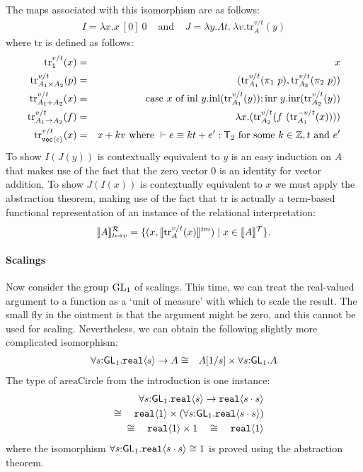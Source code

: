 The maps associated with this isomorphism are as follows:
\newcommand{\trans}[3]{\mathrm{tr}_{#1}^{{#2}/{#3}}}
\begin{eqnarray*}
I = \lambda x. x\ [0]\ 0 & \text{ and } &
J = \lambda y. \Lambda t.\ \lambda v. \trans A v t(y)
\end{eqnarray*}
where $\mathrm{tr}$ is defined as follows:
\begin{eqnarray*}
\trans{1} v t(x) & = & x\\
\trans{A_1\times A_2} v t(p) & = & (\trans{A_1} v t(\pi_1\ p),\trans{A_2} v t(\pi_2\ p))\\
\trans{A_1 + A_2} v t(x) & = & \textrm{case}\ x\ \textrm{of}\ \textrm{inl}\ y.\textrm{inl}(\trans{A_1} v t(y)); \textrm{inr}\ y.\textrm{inr}(\trans{A_2} v t(y))\\
\trans{A_1\to A_2} v t(f) & = & \lambda x. (\trans{A_2} v t(f\ (\trans{A_1}{-v} t(x))))\\
\trans{\tyPrim{vec}{e}} v t (x) & = & x + kv\text{ where }\vdash e \equiv k t + e' : \SynTransl{2}\text{ for some }k\in\setOfIntegers, t \text{ and }e'\\
\end{eqnarray*}
To show $I(J(y))$ is contextually equivalent to $y$ is an easy induction on $A$ that
makes use of the fact that the zero vector $0$ is an identity for vector addition. 
To show $J(I(x))$ is contextually equivalent to $x$ we must apply the abstraction theorem,
making use of the fact that $\mathrm{tr}$ is actually a term-based functional representation
of an instance of the relational interpretation:
\[
\rsem A {t \mapsto v} {} = \{ (x, \tmSem{\trans A v t (x)}) \mid x \in \tySem A\}.
\]

\paragraph{Scalings}
Now consider the group $\mathrm{GL}_1$ of scalings. This time, we can treat the real-valued
argument to a function as a `unit of measure' with which to scale the result. The small
fly in the ointment is that the argument might be zero, and this cannot be used for scaling.
Nevertheless, we can obtain the following slightly more complicated isomorphism:
\begin{eqnarray*}
\forall s\mathord:\mathsf{GL}_1.\textup{\texttt{real}}\langle s \rangle\to A
& \cong &
A[1/s]\times \forall s\mathord:\mathsf{GL}_1.A
\end{eqnarray*}
The type of $\mathrm{areaCircle}$ from the introduction is one instance:
\begin{eqnarray*}
\forall s\mathord:\mathsf{GL}_1.\textup{\texttt{real}}\langle s \rangle\to\textup{\texttt{real}}\langle s\cdot s \rangle\\
\quad\cong\quad \textup{\texttt{real}}\langle 1 \rangle\times(\forall s\mathord:\mathsf{GL}_1.\textup{\texttt{real}}\langle s\cdot s \rangle)\\
\quad\cong\quad \textup{\texttt{real}}\langle 1 \rangle\times 1\quad\cong\quad \textup{\texttt{real}}\langle 1 \rangle
\end{eqnarray*}
where the isomorphism $\forall s\mathord:\mathsf{GL}_1.\textup{\texttt{real}}\langle s\cdot s \rangle\cong 1$ is
proved using the abstraction theorem. 

